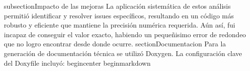 {}\markdownRendererBackslash{}subsection\markdownRendererLeftBrace{}Impacto de las mejoras\markdownRendererRightBrace{}\markdownRendererInterblockSeparator
{}La aplicación sistemática de estos análisis permitió identificar y resolver issues específicos, resultando en un código más robusto y eficiente que mantiene la precisión numérica requerida. \markdownRendererBackslash{} Aún así, fui incapaz de conseguir el valor exacto, habiendo un pequeñisimo error de redondeo que no logro encontrar desde donde ocurre.\markdownRendererInterblockSeparator
{}\markdownRendererBackslash{}section\markdownRendererLeftBrace{}Documentacion\markdownRendererRightBrace{} Para la generación de documentación técnica se utilizó Doxygen. La configuración clave del Doxyfile incluyó: \markdownRendererBackslash{}begin\markdownRendererLeftBrace{}center\markdownRendererRightBrace{} \markdownRendererBackslash{}begin\markdownRendererLeftBrace{}markdown\markdownRendererRightBrace{} \markdownRendererDocumentEnd